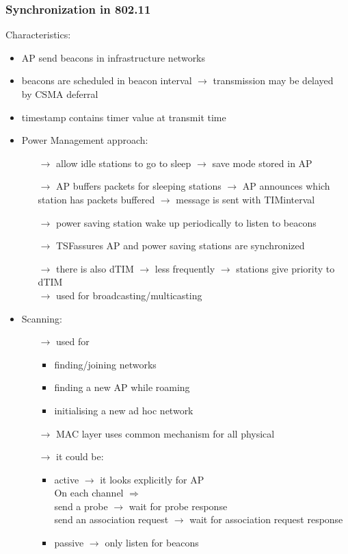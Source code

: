 \subsubsection{Synchronization in 802.11}
Characteristics:
\begin{itemize}
    \item AP send beacons in infrastructure networks
    \item beacons are scheduled in beacon interval
    $\rightarrow$ transmission may be delayed\\by CSMA deferral
    \item timestamp contains timer value at transmit time
    \item Power Management approach:
    \begin{itemize}
        \item[$\rightarrow$] allow idle stations to go to sleep $\rightarrow$ save mode stored in AP
        \item[$\rightarrow$] AP buffers packets for sleeping stations
        $\rightarrow$ AP announces which station has packets buffered
        $\rightarrow$ message is sent with TIM\footTIM interval
        \item[$\rightarrow$] power saving station wake up periodically to listen to beacons
        \item[$\rightarrow$] TSF\footTSF assures AP and power saving stations are synchronized
        \item[$\rightarrow$] there is also dTIM $\rightarrow$ less frequently $\rightarrow$  stations give priority to dTIM\\$\rightarrow$ used for broadcasting/multicasting
    \end{itemize}
    \item Scanning:
    \begin{itemize}
        \item[$\rightarrow$] used for
        \begin{itemize}
            \item finding/joining networks
            \item finding a new AP while roaming
            \item initialising a new ad hoc network
        \end{itemize}
        \item[$\rightarrow$] MAC layer uses common mechanism for all physical
        \item[$\rightarrow$] it could be:
        \begin{itemize}
            \item active $\rightarrow$ it looks explicitly for AP\\
            On each channel $\Rightarrow$\\send a probe $\rightarrow$ wait for probe response\\
            send an association request $\rightarrow$ wait for association request response
            \item passive $\rightarrow$ only listen for beacons
        \end{itemize}
    \end{itemize}
\end{itemize}

